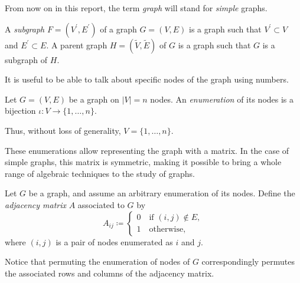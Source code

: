 \documentclass[../../main.tex]{subfiles} %
\begin{document}
\begin{remark}
	From now on in this report, the term \textit{graph} will stand for 
	\textit{simple} graphs.
\end{remark}

\begin{definition}
	A \textit{subgraph} \(F=(V^\prime, E^\prime)\) of a graph \(G=(V, E)\) is 
	a 
	graph such that \(V^\prime \subset V\) and \(E^\prime \subset E\). A 
	parent graph \(H=(\tilde V, \tilde E)\) of \(G\) is a graph such that \(G\) 
	is a 
	subgraph of \(H\).
\end{definition}

It is useful to be able to talk about specific nodes of the graph using 
numbers.
\begin{definition}
	Let \(G=(V, E)\) be a graph on \(\vert V \vert = n\) nodes. An 
	\textit{enumeration} of its nodes is a bijection \(\iota: V \to \{1, \dots, 
	n\}\).
\end{definition}
\begin{remark}
	Thus, without loss of generality, \(V = \{1, \dots, n\}\).
\end{remark}

These enumerations allow representing the graph with a matrix. In the case 
of 
simple graphs, this matrix is symmetric, making it possible to bring a whole 
range of algebraic techniques to the study of graphs.
\begin{definition}
	Let \(G\) be a graph, and assume an arbitrary enumeration of its nodes. 
	Define the \textit{adjacency matrix} \(A\) associated to \(G\) by
	\begin{equation}
		A_{ij} \coloneqq \begin{cases}
			0 \quad \text{if } (i, j) \not \in E, \\
			1 \quad \text{otherwise},
		\end{cases}
	\end{equation}
	where \((i, j)\) is a pair of nodes enumerated as \(i\) and \(j\).
\end{definition}
\begin{remark}
	Notice that permuting the enumeration of nodes of \(G\) correspondingly 
	permutes the associated rows and columns of the adjacency matrix.
\end{remark}
\end{document}
